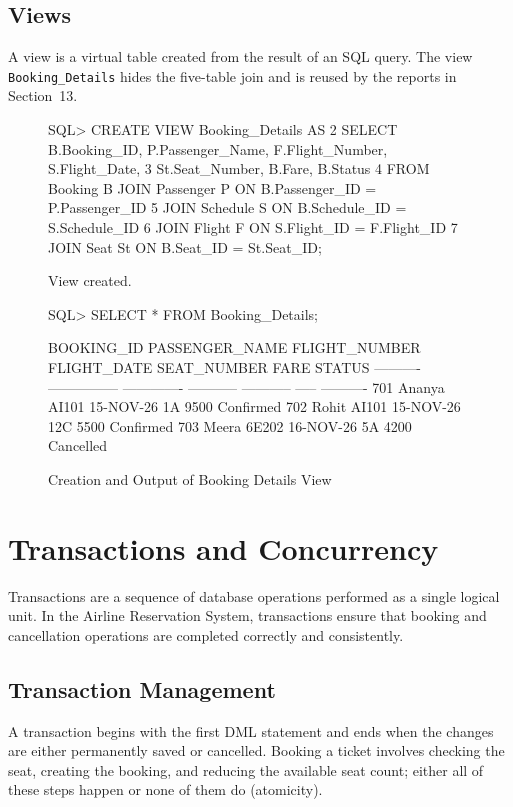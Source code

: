\documentclass[12pt,a4paper]{article}
\begin{document}
\subsection{Views}
A view is a virtual table created from the result of an SQL query. The view \texttt{Booking\_Details}
hides the five-table join and is reused by the reports in Section~13.
\begin{figure}[H]
\begin{terminal}
SQL> CREATE VIEW Booking_Details AS
  2  SELECT B.Booking_ID, P.Passenger_Name, F.Flight_Number, S.Flight_Date,
  3         St.Seat_Number, B.Fare, B.Status
  4  FROM Booking B JOIN Passenger P ON B.Passenger_ID = P.Passenger_ID
  5  JOIN Schedule S ON B.Schedule_ID = S.Schedule_ID
  6  JOIN Flight F   ON S.Flight_ID   = F.Flight_ID
  7  JOIN Seat St    ON B.Seat_ID     = St.Seat_ID;

View created.

SQL> SELECT * FROM Booking_Details;

BOOKING_ID PASSENGER_NAME  FLIGHT_NUMBER FLIGHT_DATE SEAT_NUMBER  FARE STATUS
---------- --------------- ------------- ----------- ----------- ----- ----------
       701 Ananya          AI101         15-NOV-26   1A           9500 Confirmed
       702 Rohit           AI101         15-NOV-26   12C          5500 Confirmed
       703 Meera           6E202         16-NOV-26   5A           4200 Cancelled
\end{terminal}
\caption{Creation and Output of Booking Details View}
\end{figure}

\section{Transactions and Concurrency}
Transactions are a sequence of database operations performed as a single logical unit. In the Airline
Reservation System, transactions ensure that booking and cancellation operations are completed correctly and
consistently.

\subsection{Transaction Management}
A transaction begins with the first DML statement and ends when the changes are either permanently saved or
cancelled. Booking a ticket involves checking the seat, creating the booking, and reducing the available
seat count; either all of these steps happen or none of them do (atomicity).
\end{document}
